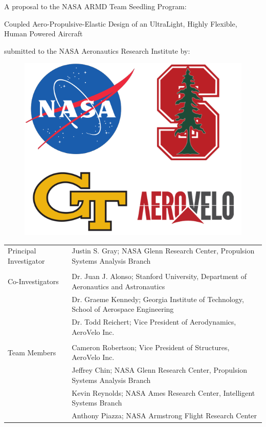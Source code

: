 \documentclass[]{aiaa-tc}
\begin{document}

  \vspace{4em}
  \begin{center}
    A proposal to the NASA ARMD Team Seedling Program: 
    \vspace{2em}

    {\Huge Coupled Aero­-Propulsive-Elastic Design of an Ultra­Light, Highly Flexible, Human Powered Aircraft}

    \vspace{2em}
    submitted to the NASA Aeronautics Research Institute by: 

    \vspace{3em}
    \begin{figure}
        \centering
        \includegraphics[width=.5\textwidth]{images/seedling_logos}
    \end{figure}
    \vspace{3em}


  \end{center}


  \begin{tabular}{l l}
    Principal Investigator & Justin S. Gray; NASA Glenn Research Center, Propulsion Systems Analysis Branch \\ 
    & \\
    Co-Investigators & Dr. Juan J. Alonso; Stanford University, Department of Aeronautics and Astronautics \\
                     & Dr. Graeme Kennedy; Georgia Institute of Technology, School of Aerospace Engineering \\ 
                     & Dr. Todd Reichert; Vice President of Aerodynamics, AeroVelo Inc. \\
    & \\ 
    Team Members & Cameron Robertson; Vice President of Structures, AeroVelo Inc. \\ 
                 & Jeffrey Chin; NASA Glenn Research Center, Propulsion Systems Analysis Branch \\
                 & Kevin Reynolds; NASA Ames Research Center, Intelligent Systems Branch \\
                 & Anthony Piazza; NASA Armstrong Flight Research Center \\
  \end{tabular}
\end{document}
